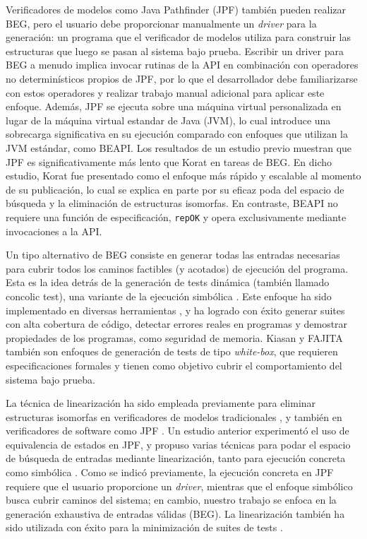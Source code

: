 Verificadores de modelos como \textsf{Java Pathfinder} \cite{Visser05} (\textsf{JPF}) también pueden realizar BEG, pero el usuario debe proporcionar manualmente un 
\emph{driver} para la generación: un programa que el verificador de modelos utiliza para construir las estructuras que luego se pasan al sistema bajo prueba. 
Escribir un driver para BEG a menudo implica invocar rutinas de la API en combinación con operadores no determinísticos propios de \textsf{JPF}, por lo que 
el desarrollador debe familiarizarse con estos operadores y realizar trabajo manual adicional para aplicar este enfoque.
Además, \textsf{JPF} se ejecuta sobre una máquina virtual personalizada en lugar de la máquina virtual estandar de Java (\textsf{JVM}), lo cual introduce una 
sobrecarga significativa en su ejecución comparado con enfoques que utilizan la \textsf{JVM} estándar, como \textsf{BEAPI}. Los resultados de un estudio previo 
\cite{Siddiqui09} muestran que \textsf{JPF} es significativamente más lento que \textsf{Korat} en tareas de BEG. En dicho estudio, \textsf{Korat} fue presentado 
como el enfoque más rápido y escalable al momento de su publicación, lo cual se explica en parte por su eficaz poda del espacio de búsqueda y la eliminación 
de estructuras isomorfas. En contraste, \textsf{BEAPI} no requiere una función de especificación, \texttt{repOK} y opera exclusivamente mediante invocaciones a la API.

Un tipo alternativo de BEG consiste en generar todas las entradas necesarias para cubrir todos los caminos factibles (y acotados) de ejecución del programa.
Esta es la idea detrás de la generación de tests dinámica (también llamado concolic test), una variante de la ejecución 
simbólica \cite{Godefroid18}. Este enfoque ha sido implementado en diversas herramientas \cite{Godefroid12,Godefroid05,Pham19,Christakis15}, y ha logrado 
con éxito generar suites con alta cobertura de código, detectar errores reales en programas y demostrar propiedades de los programas, como seguridad de memoria.
\textsf{Kiasan} \cite{Deng06} y \textsf{FAJITA} \cite{Abad13} también son enfoques de generación de tests de tipo \emph{white-box}, que requieren especificaciones 
formales y tienen como objetivo cubrir el comportamiento del sistema bajo prueba.

La técnica de linearización ha sido empleada previamente para eliminar estructuras isomorfas en verificadores de modelos tradicionales \cite{Iosif02,Robby03}, y también 
en verificadores de software como \textsf{JPF} \cite{Visser06}. Un estudio anterior experimentó el uso de equivalencia de estados en \textsf{JPF}, y propuso varias técnicas 
para podar el espacio de búsqueda de entradas mediante linearización, tanto para ejecución concreta como simbólica \cite{Visser06}. 
Como se indicó previamente, la ejecución concreta en \textsf{JPF} requiere que el usuario proporcione un \emph{driver}, 
mientras que el enfoque simbólico busca cubrir caminos del sistema; en cambio, nuestro trabajo se enfoca en la 
generación exhaustiva de entradas válidas (BEG). 
La linearización también ha sido utilizada con éxito para la minimización de suites de tests \cite{Xie04}.


